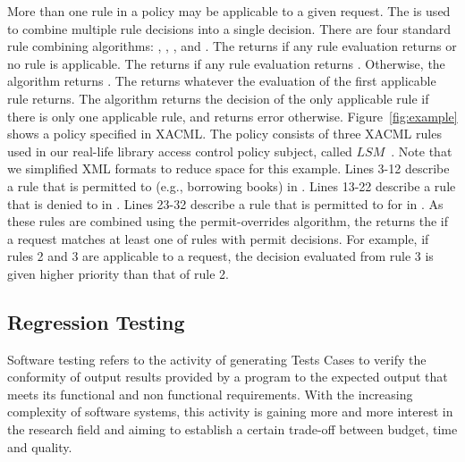 More than one rule in a policy may be applicable to a given request.
The  is used to combine multiple
rule decisions into a single decision. There are four standard rule
combining algorithms: , , , and . The
 returns  if any rule
evaluation returns  or no rule is applicable. The
 returns  if any
rule evaluation returns . Otherwise, the algorithm
returns .
The  returns whatever the
evaluation of the first applicable rule returns. The
 algorithm returns the decision of the only
applicable rule if there is only one applicable rule, and returns
error otherwise.
Figure~\ref{fig:example} shows a policy specified
in XACML. The policy consists of three XACML rules used in our real-life library access
control policy subject, called $LSM$~\cite{mouelhi09:tranforming}.
Note that we simplified XML formats to reduce
space for this example.
Lines 3-12 describe a rule that  is permitted to  (e.g., borrowing books)  in .
Lines 13-22 describe a rule that  is denied to   in .
Lines 23-32 describe a rule that  is permitted to  for  in .
As these rules are combined using the permit-overrides algorithm, the  returns the  if
 a request matches at least one of rules with permit decisions. For example, if rules 2 and 3 are applicable to a request, the decision
evaluated from rule 3 is given higher priority than that of rule 2.


\subsection{Regression Testing}
Software testing \cite{Myers:1979:AST:539883} refers to the activity of generating Tests Cases to verify the conformity of output results provided by a 
program to the expected output that meets its functional and non functional requirements. With the increasing complexity of software systems, 
this activity is gaining more and more interest in the research field and aiming to establish a certain trade-off between budget, 
time and quality. 

